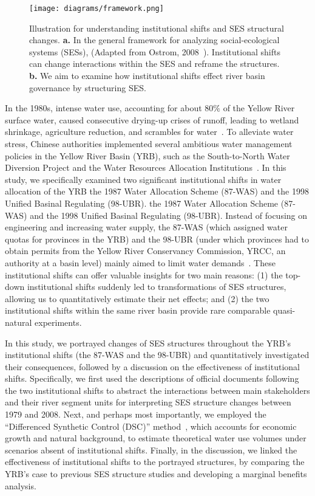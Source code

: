 \begin{figure}[!ht]
	\centering
	\texttt{[image: diagrams/framework.png]}
	\caption{
		Illustration for understanding institutional shifts and SES structural changes. \textbf{a.} In the general framework for analyzing social-ecological systems (SESs), (Adapted from Ostrom, 2008~\cite{ostrom2009}). Institutional shifts can change interactions within the SES and reframe the structures.  \textbf{b.} We aim to examine how institutional shifts effect river basin governance by structuring SES.}\label{fig:framework}
\end{figure}

In the 1980s, intense water use, accounting for about $80\%$ of the Yellow River surface water, caused consecutive drying-up crises of runoff, leading to wetland shrinkage, agriculture reduction, and scrambles for water~\cite{wohlfart2016}.
To alleviate water stress, Chinese authorities implemented several ambitious water management policies in the Yellow River Basin (YRB), such as the South-to-North Water Diversion Project and the Water Resources Allocation Institutions~\cite{long2020, wang2019d}.
In this study, we specifically examined two significant institutional shifts in water allocation of the YRB\: the 1987 Water Allocation Scheme (87-WAS) and the 1998 Unified Basinal Regulating (98-UBR).
the 1987 Water Allocation Scheme (87-WAS) and the 1998 Unified Basinal Regulating (98-UBR).
Instead of focusing on engineering and increasing water supply, the 87-WAS (which assigned water quotas for provinces in the YRB) and the 98-UBR (under which provinces had to obtain permits from the Yellow River Conservancy Commission, YRCC, an authority at a basin level) mainly aimed to limit water demands~\cite{bouckaert2022, speed2013}.
These institutional shifts can offer valuable insights for two main reasons:
(1) the top-down institutional shifts suddenly led to transformations of SES structures, allowing us to quantitatively estimate their net effects; and (2) the two institutional shifts within the same river basin provide rare comparable quasi-natural experiments.

In this study, we portrayed changes of SES structures throughout the YRB's institutional shifts (the 87-WAS and the 98-UBR) and quantitatively investigated their consequences, followed by a discussion on the effectiveness of institutional shifts.
Specifically, we first used the descriptions of official documents following the two institutional shifts to abstract the interactions between main stakeholders and their river segment units for interpreting SES structure changes between 1979 and 2008.
Next, and perhaps most importantly, we employed the ``Differenced Synthetic Control (DSC)'' method~\cite{arkhangelsky2021}, which accounts for economic growth and natural background, to estimate theoretical water use volumes under scenarios absent of institutional shifts.
Finally, in the discussion, we linked the effectiveness of institutional shifts to the portrayed structures, by comparing the YRB's case to previous SES structure studies and developing a marginal benefits analysis.
